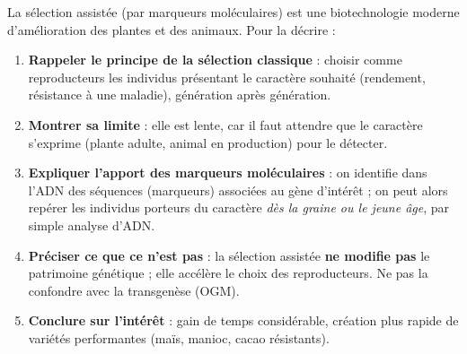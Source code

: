 \documentclass[11pt]{article}
\begin{document}
\begin{methode}
La sélection assistée (par marqueurs moléculaires) est une biotechnologie moderne d'amélioration des plantes et des animaux. Pour la décrire :
\begin{enumerate}
\item \textbf{Rappeler le principe de la sélection classique} : choisir comme reproducteurs les individus présentant le caractère souhaité (rendement, résistance à une maladie), génération après génération.
\item \textbf{Montrer sa limite} : elle est lente, car il faut attendre que le caractère s'exprime (plante adulte, animal en production) pour le détecter.
\item \textbf{Expliquer l'apport des marqueurs moléculaires} : on identifie dans l'ADN des séquences (marqueurs) associées au gène d'intérêt ; on peut alors repérer les individus porteurs du caractère \emph{dès la graine ou le jeune âge}, par simple analyse d'ADN.
\item \textbf{Préciser ce que ce n'est pas} : la sélection assistée \textbf{ne modifie pas} le patrimoine génétique ; elle accélère le choix des reproducteurs. Ne pas la confondre avec la transgenèse (OGM).
\item \textbf{Conclure sur l'intérêt} : gain de temps considérable, création plus rapide de variétés performantes (maïs, manioc, cacao résistants).
\end{enumerate}
\end{methode}
\end{document}
